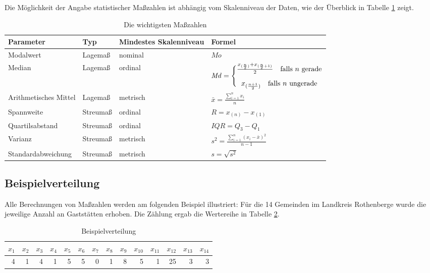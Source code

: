 \documentclass[
  11pt,
  ngerman,
  a4paper,
]{report}
\begin{document}
Die Möglichkeit der Angabe statistischer Maßzahlen ist abhängig vom Skalenniveau der Daten, wie der Überblick in Tabelle \ref{tab:mass} zeigt.

\begin{table}

\caption{\label{tab:mass}Die wichtigsten Maßzahlen}
\centering
\begin{tabular}[t]{llll}
\toprule
Parameter & Typ & Mindestes Skalenniveau & Formel\\
\midrule
Modalwert & Lagemaß & nominal & \medskip$\mathit{Mo}$\\
Median & Lagemaß & ordinal & \medskip$\def\arraystretch{1.2} \mathit{Md} = \Bigg\{\begin{array}{@{}c@{}}\frac{x_{(\frac{n}{2})}+x_{(\frac{n}{2}+1)}}{2} \quad \textrm{falls }n \textrm{ gerade}\\[6pt] x_{(\frac{n+1}{2})}\quad \textrm{falls }n \textrm{ ungerade}\end{array}$\\
Arithmetisches Mittel & Lagemaß & metrisch & \medskip$\bar{x}=\frac{\sum\limits_{i=1}^{n}x _{i}}{n}$\\
Spannweite & Streumaß & ordinal & \medskip$R=x_{(n)}-x_{(1)}$\\
Quartilsabstand & Streumaß & ordinal & \medskip$\mathit{IQR}=Q_3-Q_1$\\
Varianz & Streumaß & metrisch & \medskip$s^2=\frac{\sum\limits_{i=1}^{n}(x_{i}-\bar{x})^2}{n-1}$\\
Standardabweichung & Streumaß & metrisch & \medskip$s=\sqrt{s^2}$\\
\bottomrule
\end{tabular}
\end{table}

\hypertarget{beispielverteilung}{%
\subsection{Beispielverteilung}\label{beispielverteilung}}

Alle Berechnungen von Maßzahlen werden am folgenden Beispiel illustriert: Für die 14 Gemeinden im Landkreis Rothenberge wurde die jeweilige Anzahl an Gaststätten erhoben. Die Zählung ergab die Wertereihe in Tabelle \ref{tab:werte}.

\begin{table}

\caption{\label{tab:werte}Beispielverteilung}
\centering
\begin{tabular}[t]{rrrrrrrrrrrrrr}
\toprule
$x_{1}$ & $x_{2}$ & $x_{3}$ & $x_{4}$ & $x_{5}$ & $x_{6}$ & $x_{7}$ & $x_{8}$ & $x_{9}$ & $x_{10}$ & $x_{11}$ & $x_{12}$ & $x_{13}$ & $x_{14}$\\
\midrule
4 & 1 & 4 & 1 & 5 & 5 & 0 & 1 & 8 & 5 & 1 & 25 & 3 & 3\\
\bottomrule
\end{tabular}
\end{table}
\end{document}
